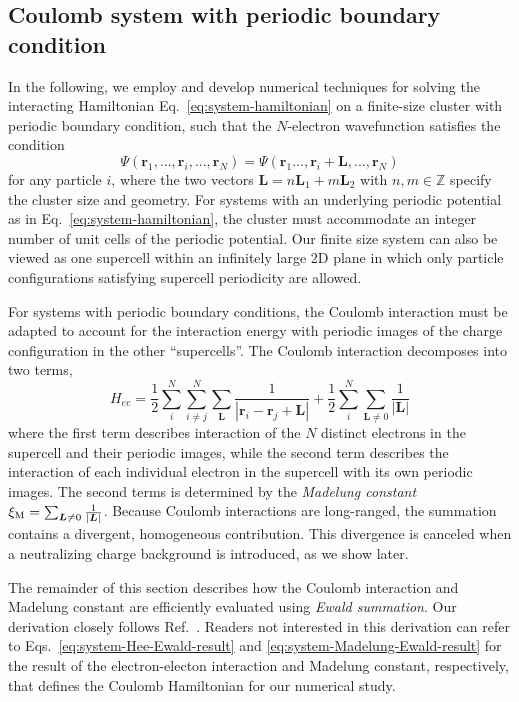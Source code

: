 \documentclass[
 reprint,
 amsmath,amssymb,
 aps, prx,
floatfix,longbibliography,
]{revtex4-2}
\begin{document}
\begin{appendix}

\section{Coulomb system with periodic boundary condition}
\label{app:ewald}

In the following, we employ and develop numerical techniques for solving the interacting Hamiltonian Eq.~\eqref{eq:system-hamiltonian} on a finite-size cluster with periodic boundary condition, such that the $N$-electron wavefunction satisfies the condition 
\begin{equation}
    \Psi(\bm r_1, ..., \bm r_i, ..., \bm r_N) = \Psi( \bm r_1 ..., \bm r_i + \bm L, ..., \bm r_N)
\end{equation}
for any particle $i$, where the two vectors $\bm L = n \bm L_1 + m \bm L_2$ with $n,m \in \mathbb{Z}$ specify the cluster size and geometry. For systems with an underlying periodic potential as in Eq.~\eqref{eq:system-hamiltonian}, the cluster must accommodate an integer number of unit cells of the periodic potential. Our finite size system can also be viewed as one supercell within an infinitely large 2D plane in which only particle configurations satisfying supercell periodicity are allowed. 

For systems with periodic boundary conditions, the Coulomb interaction must be adapted to account for the interaction energy with periodic images of the charge configuration in the other ``supercells''. The Coulomb interaction decomposes into two terms,
\begin{equation}
    H_{ee}=\frac{1}{2}\sum_{i}^{N}\sum_{i\neq j}^{N}\sum_{\bm{L}}\frac{1}{|\bm{r}_{i}-\bm{r}_{j}+\bm{L}|}+\frac{1}{2}\sum_{i}^{N}\sum_{\bm{L}\neq0}\frac{1}{|\bm{L}|}
    \label{eq:system-ewald-Hee-periodic}
\end{equation}
where the first term describes interaction of the $N$ distinct electrons in the supercell and their periodic images, while the second term describes the interaction of each individual electron in the supercell with its own periodic images. The second terms is determined by the \emph{Madelung
constant} $\xi_{{\rm M}}=\sum_{\bm{L}\neq0}\frac{1}{|\bm{L}|}$. 
Because Coulomb interactions are long-ranged, the summation contains a divergent, homogeneous contribution. This divergence is canceled when a neutralizing charge background is introduced, as we show later.  


The remainder of this section describes how the Coulomb interaction and Madelung constant are efficiently evaluated using \emph{Ewald summation}. Our derivation closely follows Ref.~\cite{Fraser1996Jan}. Readers not interested in this derivation can refer to Eqs.~\eqref{eq:system-Hee-Ewald-result} and \eqref{eq:system-Madelung-Ewald-result} for the result of the electron-electon interaction and Madelung constant, respectively, that defines the Coulomb Hamiltonian for our numerical study. 


\end{appendix}
\end{document}
